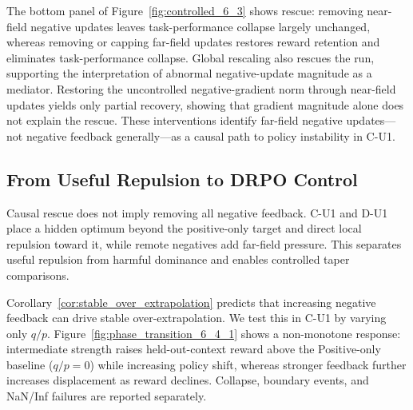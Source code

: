 \documentclass{article}
\theoremstyle{plain}
\theoremstyle{definition}
\theoremstyle{remark}
\begin{document}
The bottom panel of Figure~\ref{fig:controlled_6_3} shows rescue: removing
near-field negative updates leaves task-performance collapse largely unchanged,
whereas removing or capping far-field updates restores reward retention and
eliminates task-performance collapse. Global rescaling also rescues the run, supporting the interpretation of
abnormal negative-update magnitude as a mediator. Restoring the uncontrolled negative-gradient norm through near-field updates
yields only partial recovery, showing that gradient magnitude alone does not
explain the rescue.
These interventions identify far-field negative updates---not negative
feedback generally---as a causal path to policy instability in C-U1.

\subsection{From Useful Repulsion to DRPO Control}
\label{sec:repulsion_control}

Causal rescue does not imply removing all negative feedback. C-U1 and D-U1
place a hidden optimum beyond the positive-only target and direct local
repulsion toward it, while remote negatives add far-field pressure. This
separates useful repulsion from harmful dominance and enables controlled taper
comparisons.

Corollary~\ref{cor:stable_over_extrapolation} predicts that increasing
negative feedback can drive stable over-extrapolation. We test this in C-U1
by varying only \(q/p\). Figure~\ref{fig:phase_transition_6_4_1} shows a
non-monotone response: intermediate strength raises held-out-context reward
above the Positive-only baseline (\(q/p=0\)) while increasing policy shift,
whereas stronger feedback further increases displacement as reward declines. Collapse, boundary events, and NaN/Inf
failures are reported separately.
\begin{table}
\vspace{-0.7em}
\centering
\caption{\textbf{Protocol-matched external transfer.}
D4RL aggregate and nine-task structured-generation (SG-9) macro Pass@8.}
\label{tab:taper_transfer_summary}
\scriptsize
\renewcommand{\arraystretch}{0.88}
\vspace{-0.5em}
\end{table}
\end{document}
